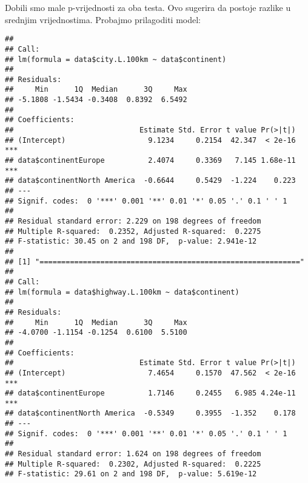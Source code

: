 \documentclass[
]{article}
\newenvironment{Shaded}{\begin{snugshade}}{\end{snugshade}}
\newcommand{\FloatTok}[1]{\textcolor[rgb]{0.00,0.00,0.81}{#1}}
\newcommand{\FunctionTok}[1]{\textcolor[rgb]{0.13,0.29,0.53}{\textbf{#1}}}
\newcommand{\NormalTok}[1]{#1}
\newcommand{\OtherTok}[1]{\textcolor[rgb]{0.56,0.35,0.01}{#1}}
\newcommand{\SpecialCharTok}[1]{\textcolor[rgb]{0.81,0.36,0.00}{\textbf{#1}}}
\newcommand{\StringTok}[1]{\textcolor[rgb]{0.31,0.60,0.02}{#1}}
\begin{document}
Dobili smo male p-vrijednosti za oba testa. Ovo sugerira da postoje
razlike u srednjim vrijednostima. Probajmo prilagoditi model:

\begin{Shaded}
\end{Shaded}

\begin{verbatim}
## 
## Call:
## lm(formula = data$city.L.100km ~ data$continent)
## 
## Residuals:
##     Min      1Q  Median      3Q     Max 
## -5.1808 -1.5434 -0.3408  0.8392  6.5492 
## 
## Coefficients:
##                             Estimate Std. Error t value Pr(>|t|)    
## (Intercept)                   9.1234     0.2154  42.347  < 2e-16 ***
## data$continentEurope          2.4074     0.3369   7.145 1.68e-11 ***
## data$continentNorth America  -0.6644     0.5429  -1.224    0.223    
## ---
## Signif. codes:  0 '***' 0.001 '**' 0.01 '*' 0.05 '.' 0.1 ' ' 1
## 
## Residual standard error: 2.229 on 198 degrees of freedom
## Multiple R-squared:  0.2352, Adjusted R-squared:  0.2275 
## F-statistic: 30.45 on 2 and 198 DF,  p-value: 2.941e-12
## 
## [1] "============================================================"
## 
## Call:
## lm(formula = data$highway.L.100km ~ data$continent)
## 
## Residuals:
##     Min      1Q  Median      3Q     Max 
## -4.0700 -1.1154 -0.1254  0.6100  5.5100 
## 
## Coefficients:
##                             Estimate Std. Error t value Pr(>|t|)    
## (Intercept)                   7.4654     0.1570  47.562  < 2e-16 ***
## data$continentEurope          1.7146     0.2455   6.985 4.24e-11 ***
## data$continentNorth America  -0.5349     0.3955  -1.352    0.178    
## ---
## Signif. codes:  0 '***' 0.001 '**' 0.01 '*' 0.05 '.' 0.1 ' ' 1
## 
## Residual standard error: 1.624 on 198 degrees of freedom
## Multiple R-squared:  0.2302, Adjusted R-squared:  0.2225 
## F-statistic: 29.61 on 2 and 198 DF,  p-value: 5.619e-12
\end{verbatim}
\end{document}
